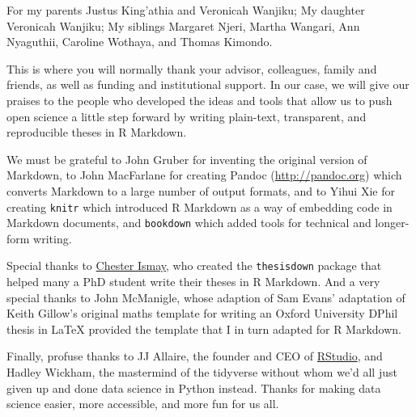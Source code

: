 \documentclass[a4paper, nobind]{templates/ociamthesis}
\begin{document}

\begin{romanpages}

\maketitle

\begin{dedication}
  For my parents Justus King'athia and Veronicah Wanjiku; My daughter Veronicah Wanjiku; My siblings Margaret Njeri, Martha Wangari, Ann Nyaguthii, Caroline Wothaya, and Thomas Kimondo.
\end{dedication}

\begin{acknowledgements}
 	This is where you will normally thank your advisor, colleagues, family and friends, as well as funding and institutional support. In our case, we will give our praises to the people who developed the ideas and tools that allow us to push open science a little step forward by writing plain-text, transparent, and reproducible theses in R Markdown.

  We must be grateful to John Gruber for inventing the original version of Markdown, to John MacFarlane for creating Pandoc (\url{http://pandoc.org}) which converts Markdown to a large number of output formats, and to Yihui Xie for creating \texttt{knitr} which introduced R Markdown as a way of embedding code in Markdown documents, and \texttt{bookdown} which added tools for technical and longer-form writing.

  Special thanks to \href{http://chester.rbind.io}{Chester Ismay}, who created the \texttt{thesisdown} package that helped many a PhD student write their theses in R Markdown. And a very special thanks to John McManigle, whose adaption of Sam Evans' adaptation of Keith Gillow's original maths template for writing an Oxford University DPhil thesis in LaTeX provided the template that I in turn adapted for R Markdown.

  Finally, profuse thanks to JJ Allaire, the founder and CEO of \href{http://rstudio.com}{RStudio}, and Hadley Wickham, the mastermind of the tidyverse without whom we'd all just given up and done data science in Python instead. Thanks for making data science easier, more accessible, and more fun for us all.


\end{acknowledgements}
\end{romanpages}
\end{document}
